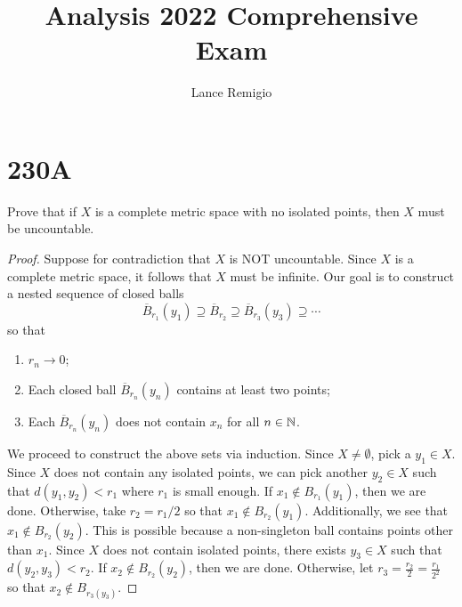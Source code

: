 \documentclass[a4paper]{article}
\title{Analysis 2022 Comprehensive Exam}
\author{Lance Remigio}
\begin{document}
\maketitle
\section{230A}
\begin{problem}
   Prove that if \( X  \) is a complete metric space with no isolated points, then \( X  \) must be uncountable. 
\end{problem}
\begin{proof}
Suppose for contradiction that \( X  \) is NOT uncountable. Since \( X  \) is a complete metric space, it follows that \( X  \) must be infinite. Our goal is to construct a nested sequence of closed balls 
\[ \overline{B}_{{r}_{1}}({y}_{1}) \supseteq \overline{B}_{{r}_{2}} \supseteq \overline{B}_{{r}_{3}}({y}_{3}) \supseteq \cdots \]
so that 
\begin{enumerate}
    \item[(1)] \( {r}_{n} \to  0 \);
    \item[(2)] Each closed ball \( \overline{B}_{{r}_{n}}({y}_{n}) \) contains at least two points; 
    \item[(3)] Each \( \overline{B}_{{r}_{n}}({y}_{n})  \) does not contain \( {x}_{n} \) for all \( n \in \mathbb{N} \).
\end{enumerate}

We proceed to construct the above sets via induction. Since \( X \neq \emptyset \), pick a \( {y}_{1} \in X  \). Since \( X \) does not contain any isolated points, we can pick another \( {y}_{2} \in X  \) such that \( d({y}_{1}, {y}_{2}) < {r}_{1} \) where \( {r}_{1} \) is small enough. If \( {x}_{1} \notin {B}_{{r}_{1}}({y}_{1})  \), then we are done. Otherwise, take \( {r}_{2} = {r}_{1} / 2  \) so that \( {x}_{1} \notin {B}_{{r}_{2}}({y}_{1}) \). Additionally, we see that \( {x}_{1} \notin {B}_{{r}_{2}}({y}_{2}) \). This is possible because a non-singleton ball contains points other than \( {x}_{1} \). Since \( X  \) does not contain isolated points, there exists \( {y}_{3} \in X  \) such that \( d({y}_{2}, {y}_{3}) < {r}_{2} \). If \( {x}_{2} \notin {B}_{{r}_{2}}({y}_{2}) \), then we are done. Otherwise, let \( {r}_{3} = \frac{ {r}_{2} }{  2 } = \frac{ {r}_{1} }{  2^{2} } \) so that \( {x}_{2} \notin {B}_{{r}_{3}({y}_{3})} \).


\end{proof}
\end{document}
